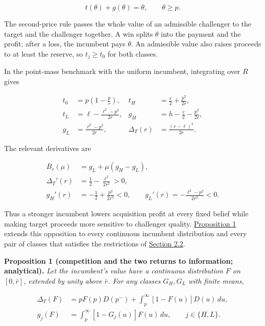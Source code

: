 \[
t(\theta)+g(\theta)=\theta,\qquad \theta\ge p.
\]

The second-price rule passes the whole value of an admissible challenger
to the target and the challenger together. A win splits \(\theta\) into
the payment and the profit; after a loss, the incumbent pays \(\theta\).
An admissible value also raises proceeds to at least the reserve, so
\(t_j\ge t_0\) for both classes.

In the point-mass benchmark with the uniform incumbent, integrating over
\(R\) gives

\[
\begin{aligned}
t_0&=p\left(1-\frac p r\right),&
t_H&=\frac r2+\frac{p^2}{2r},\\
t_L&=\ell-\frac{\ell^2-p^2}{2r},&
g_H&=h-\frac r2-\frac{p^2}{2r},\\
g_L&=\frac{\ell^2-p^2}{2r},&
\Delta_T(r)&=\frac{(r-\ell)^2}{2r}.
\end{aligned}
\tag{4}\label{eq:paper-4}
\]

The relevant derivatives are

\[
\begin{aligned}
B_r(\mu)&=g_L+\mu(g_H-g_L),\\
\Delta_T'(r)&=\frac12-\frac{\ell^2}{2r^2}>0,\\
g_H'(r)&=-\frac12+\frac{p^2}{2r^2}<0,
\qquad g_L'(r)=-\frac{\ell^2-p^2}{2r^2}<0.
\end{aligned}
\tag{5}\label{eq:paper-5}
\]

Thus a stronger incumbent lowers acquisition profit at every fixed
belief while making target proceeds more sensitive to challenger
quality. \hyperref[result-proposition-1]{Proposition 1} extends this
opposition to every continuous incumbent distribution and every pair of
classes that satisfies the restrictions of
\hyperref[sec-values-preparation-and-the-sale]{Section 2.2}.


\protect{}\label{result-proposition-1}{\textbf{Proposition
1 (competition and the two returns to information; analytical).}}
\emph{Let the incumbent's value have a continuous distribution \(F\) on
\([0,\bar r]\), extended by unity above \(\bar r\). For any classes
\(G_H,G_L\) with finite means,}

\[
\begin{aligned}
\Delta_T(F)&=pF(p)D(p^-)+\int_p^\infty[1-F(u)]D(u)\,du,\\
g_j(F)&=\int_p^\infty[1-G_j(u)]F(u)\,du,\qquad j\in\{H,L\}.
\end{aligned}
\tag{6}\label{eq:paper-6}
\]


